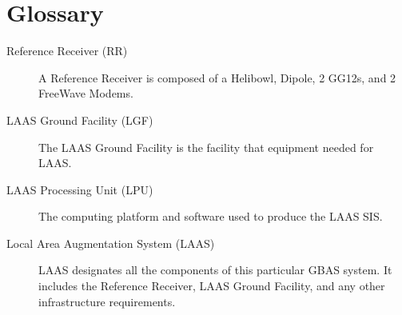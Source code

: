 \chapter{Glossary}
\begin{description}
	\item[Reference Receiver (RR)] A Reference Receiver is composed of a Helibowl, Dipole, 2 GG12s, and 2 FreeWave Modems. 
	\item[LAAS Ground Facility (LGF)] The LAAS Ground Facility is the facility that equipment needed for LAAS.
	\item[LAAS Processing Unit (LPU)] The computing platform and software used to produce the LAAS SIS.
	\item[Local Area Augmentation System (LAAS)] LAAS designates all the components of this particular GBAS system.  It includes the Reference Receiver, LAAS Ground Facility, and any other infrastructure requirements.  
\end{description}